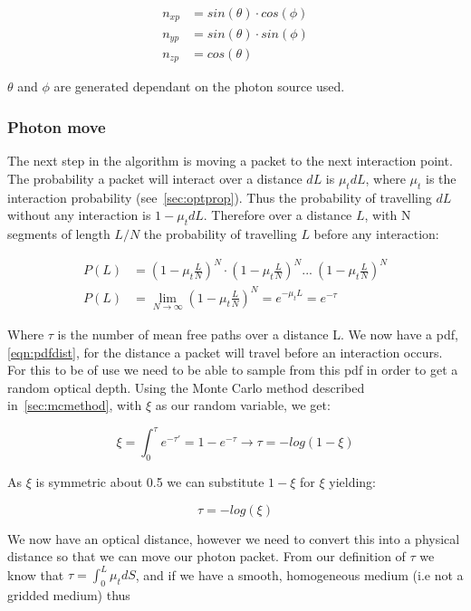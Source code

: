 \begin{align}
n_{xp} &= sin(\theta) \cdot cos(\phi) \\
n_{yp} &= sin(\theta) \cdot sin(\phi) \\
n_{zp} &= cos(\theta)
\end{align}

$\theta$ and $\phi$ are generated dependant on the photon source used.

\subsubsection{Photon move}\label{sec:photmove}

The next step in the algorithm is moving a packet to the next interaction point. The probability a packet will interact over a distance $dL$ is $\mu_tdL$, where $\mu_t$ is the interaction probability (see~\cref{sec:optprop}). Thus the probability of travelling $dL$ without any interaction is $1-\mu_tdL$. Therefore over a distance $L$, with N segments of length $L/N$ the probability of travelling $L$ before any interaction:

\begin{align}
P(L) &= (1-\mu_t\frac{L}{N})^N\cdot (1-\mu_t\frac{L}{N})^N ...\ (1-\mu_t\frac{L}{N})^N \\
P(L) &= \lim_{N \to \infty}(1-\mu_t\frac{L}{N})^N=e^{-\mu_tL}=e^{-\tau}\label{eqn:pdfdist}
\end{align}

Where $\tau$ is the number of mean free paths over a distance L. We now have a \gls{pdf}, \cref{eqn:pdfdist}, for the distance a packet will travel before an interaction occurs. For this to be of use we need to be able to sample from this \gls{pdf} in order to get a random optical depth. Using the Monte Carlo method described in~\cref{sec:mcmethod}, with $\xi$ as our random variable, we get:

\begin{equation}
\xi=\int_{0}^{\tau}e^{-\tau'}=1-e^{-\tau}\rightarrow \tau=-log(1-\xi)
\end{equation}

As $\xi$ is symmetric about 0.5 we can substitute $1-\xi$ for $\xi$ yielding:

\begin{equation}
\tau=-log(\xi)\label{eqn:taueqn}
\end{equation} 

We now have an optical distance, however we need to convert this into a physical distance so that we can move our photon packet. From our definition of $\tau$ we know that $\tau=\int_0^L\mu_tdS$, and if we have a smooth, homogeneous medium (i.e not a gridded medium) thus 

